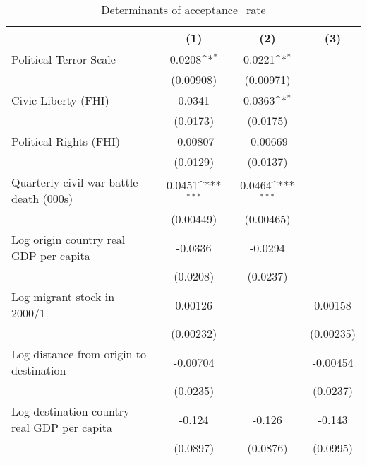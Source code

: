 \begin{table}[htbp]\centering
\def\sym#1{\ifmmode^{#1}\else\(^{#1}\)\fi}
\caption{Determinants of acceptance\_rate}
\begin{tabular}{l*{3}{c}}
\hline\hline
                    &\multicolumn{1}{c}{(1)}         &\multicolumn{1}{c}{(2)}         &\multicolumn{1}{c}{(3)}         \\
\hline
Political Terror Scale&      0.0208\sym{*}  &      0.0221\sym{*}  &                     \\
                    &   (0.00908)         &   (0.00971)         &                     \\
[1em]
Civic Liberty (FHI) &      0.0341         &      0.0363\sym{*}  &                     \\
                    &    (0.0173)         &    (0.0175)         &                     \\
[1em]
Political Rights (FHI)&    -0.00807         &    -0.00669         &                     \\
                    &    (0.0129)         &    (0.0137)         &                     \\
[1em]
Quarterly civil war battle death (000s)&      0.0451\sym{***}&      0.0464\sym{***}&                     \\
                    &   (0.00449)         &   (0.00465)         &                     \\
[1em]
Log origin country real GDP per capita&     -0.0336         &     -0.0294         &                     \\
                    &    (0.0208)         &    (0.0237)         &                     \\
[1em]
Log migrant stock in 2000/1&     0.00126         &                     &     0.00158         \\
                    &   (0.00232)         &                     &   (0.00235)         \\
[1em]
Log distance from origin to destination&    -0.00704         &                     &    -0.00454         \\
                    &    (0.0235)         &                     &    (0.0237)         \\
[1em]
Log destination country real GDP per capita&      -0.124         &      -0.126         &      -0.143         \\
                    &    (0.0897)         &    (0.0876)         &    (0.0995)         \\

\end{tabular}
\end{table}
